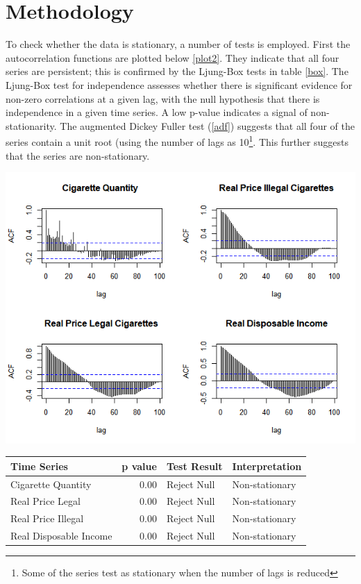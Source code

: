 \documentclass[11pt,preprint, authoryear]{elsarticle}
\let\origfigure\figure
\let\endorigfigure\endfigure
\renewenvironment{figure}[1][2] {
    \expandafter\origfigure\expandafter[H]
} {
    \endorigfigure
}
\let\origtable\table
\let\endorigtable\endtable
\renewenvironment{table}[1][2] {
    \expandafter\origtable\expandafter[H]
} {
    \endorigtable
}
\numberwithin{equation}{section}
\numberwithin{figure}{section}
\numberwithin{table}{section}
\let\rmarkdownfootnote\footnote%
\def\footnote{\protect\rmarkdownfootnote}
\begin{document}
\hypertarget{methodology}{%
\section{\texorpdfstring{Methodology
\label{Meth}}{Methodology }}\label{methodology}}

To check whether the data is stationary, a number of tests is employed.
First the autocorrelation functions are plotted below \ref{plot2}. They
indicate that all four series are persistent; this is confirmed by the
Ljung-Box tests in table \ref{box}. The Ljung-Box test for independence
assesses whether there is significant evidence for non-zero correlations
at a given lag, with the null hypothesis that there is independence in a
given time series. A low p-value indicates a signal of non-stationarity.
The augmented Dickey Fuller test (\ref {adf}) suggests that all four of
the series contain a unit root (using the number of lags as
10\footnote{Some of the series test as stationary when the number of
  lags is reduced}. This further suggests that the series are
non-stationary.

\begin{figure}
\centering
\includegraphics{img/ACF.png}
\caption{\label{plot2} ACF Plots}
\end{figure}

\begin{table}[H]
\centering
\begin{tabular}{lrll}
  \hline
Time Series & p value & Test Result & Interpretation \\ 
  \hline
Cigarette Quantity & 0.00 & Reject Null & Non-stationary \\ 
  Real Price Legal & 0.00 & Reject Null & Non-stationary \\ 
  Real Price Illegal & 0.00 & Reject Null & Non-stationary \\ 
  Real Disposable Income & 0.00 & Reject Null & Non-stationary \\ 
   \hline
\end{tabular}
\caption{Ljung-Box Test \label{box}} 
\end{table}
\end{document}
